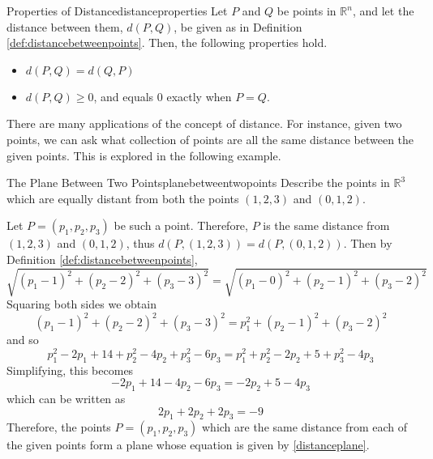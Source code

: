 \begin{theorem}{Properties of Distance}{distanceproperties}
Let $P$ and $Q$ be points in $\mathbb{R}^n$, and let the distance between them,
$d( P, Q)$, be given as in Definition \ref{def:distancebetweenpoints}. 
Then, the following properties hold.
\begin{itemize}
\item $ d( P, Q) = d( Q, P)  $
\item $ d( P, Q) \geq 0$, and equals 0 exactly when $P = Q.$
\end{itemize}
\end{theorem}

There are many applications of the concept of distance. For instance,
given two points, we can ask what collection of points are all the
same distance between the given points. This is explored in the
following example.

\begin{example}{The Plane Between Two Points}{planebetweentwopoints}
Describe the points in $\mathbb{R}^3$ which are equally distant from both the points $\left(
1,2,3\right) $ and $\left( 0,1,2\right) .$
\end{example}

\begin{solution}
Let $P = \left( p_1 , p_2, p_3\right) $ be such a point. Therefore, $P$ is the same distance from $\left(
1,2,3\right) $ and $\left( 0,1,2\right) $, thus $d(P,(1,2,3))=d(P,(0,1,2))$.
Then by Definition \ref{def:distancebetweenpoints},
\begin{equation*}
\sqrt{\left( p_1 -1\right) ^{2}+\left( p_2 -2\right) ^{2}+\left( p_3-3\right) ^{2}}=
\sqrt{\left( p_1 - 0 \right)^{2}+\left( p_2-1\right) ^{2}+\left( p_3-2\right) ^{2}}
\end{equation*}
Squaring both sides we obtain 
\begin{equation*}
\left( p_1 -1\right) ^{2}+\left( p_2 -2\right) ^{2}+\left( p_3 -3\right)
^{2}=p_1^{2}+\left( p_2-1\right) ^{2}+\left( p_3 -2\right) ^{2}
\end{equation*}
and so
\begin{equation*}
\allowbreak p_1^{2}-2p_1+14+p_2^{2}-4p_2+p_3^{2}-6p_3=p_1^{2}+p_2^{2}-2p_2+5+p_3^{2}-4p_3
\end{equation*}
Simplifying, this becomes
\begin{equation*}
-2p_1+14-4p_2-6p_3=-2p_2+5-4p_3
\end{equation*}
which can be written as 
\begin{equation}
2p_1+2p_2+2p_3=-9  \label{distanceplane}
\end{equation}
Therefore, the points $P = \left(
p_1,p_2,p_3\right) $  which are the same 
distance from each of the given points form a plane whose equation is given by \ref{distanceplane}.
\end{solution}

